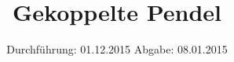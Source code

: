 

\subject{Versuch 106}
\title{Gekoppelte Pendel}
\date{
  Durchführung: 01.12.2015
  \hspace{3em}
  Abgabe: 08.01.2015
}



\maketitle
\thispagestyle{empty}
\tableofcontents
\newpage






\printbibliography


